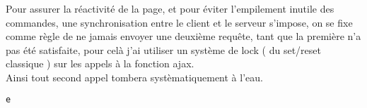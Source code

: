 Pour assurer la réactivité de la page, et pour éviter l'empilement inutile des commandes, une synchronisation entre le client et le serveur s'impose, on se fixe comme règle de ne jamais envoyer une deuxième requête, tant que la première n'a pas été satisfaite, pour celà j'ai utiliser un système de lock ( du set/reset classique ) sur les appels à la fonction ajax.\\
Ainsi tout second appel tombera systèmatiquement à l'eau.\\


\begin{DDbox}{\linewidth}
\begin{lstlisting}[language=html]
  e
\end{lstlisting}
\end{DDbox}
